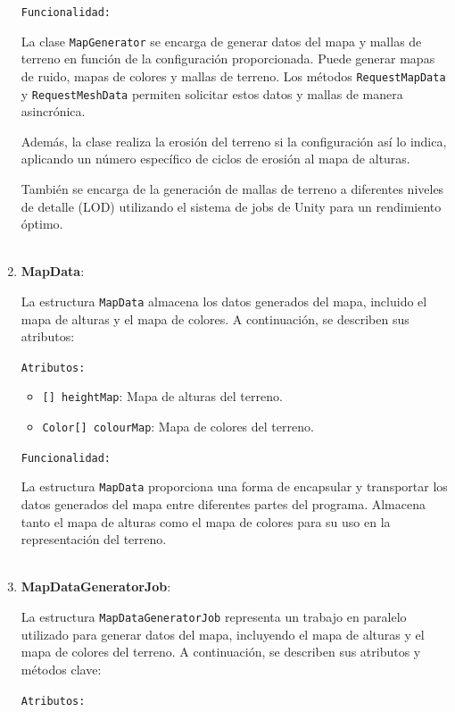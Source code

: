 \begin{enumerate}
    \texttt{Funcionalidad:}

    La clase \texttt{MapGenerator} se encarga de generar datos del mapa y mallas de terreno en función de la configuración proporcionada. Puede generar mapas de ruido, mapas de colores y mallas de terreno. Los métodos \texttt{RequestMapData} y \texttt{RequestMeshData} permiten solicitar estos datos y mallas de manera asincrónica.

    Además, la clase realiza la erosión del terreno si la configuración así lo indica, aplicando un número específico de ciclos de erosión al mapa de alturas.

    También se encarga de la generación de mallas de terreno a diferentes niveles de detalle (LOD) utilizando el sistema de jobs de Unity para un rendimiento óptimo.\\
    \\

    \item \textbf{MapData}:

    La estructura \texttt{MapData} almacena los datos generados del mapa, incluido el mapa de alturas y el mapa de colores. A continuación, se describen sus atributos:

    \texttt{Atributos:}

    \begin{itemize}
        \item \texttt{[] heightMap}: Mapa de alturas del terreno.
        \item \texttt{Color[] colourMap}: Mapa de colores del terreno.
    \end{itemize}

    \texttt{Funcionalidad:}

    La estructura \texttt{MapData} proporciona una forma de encapsular y transportar los datos generados del mapa entre diferentes partes del programa. Almacena tanto el mapa de alturas como el mapa de colores para su uso en la representación del terreno.\\
    \\

    \item \textbf{MapDataGeneratorJob}:

    La estructura \texttt{MapDataGeneratorJob} representa un trabajo en paralelo utilizado para generar datos del mapa, incluyendo el mapa de alturas y el mapa de colores del terreno. A continuación, se describen sus atributos y métodos clave:

    \texttt{Atributos:}


\end{enumerate}
